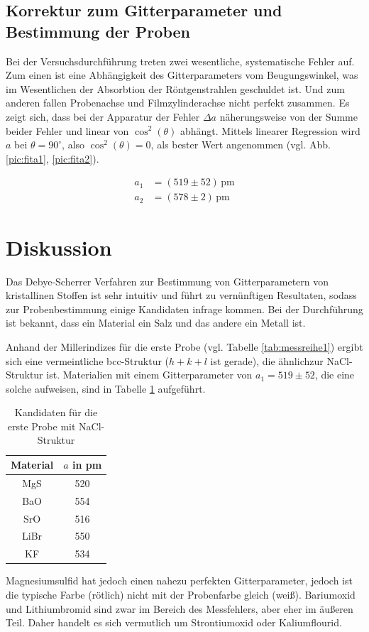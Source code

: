 \subsection{Korrektur zum Gitterparameter und Bestimmung der Proben}
Bei der Versuchsdurchführung treten zwei wesentliche, systematische Fehler auf. Zum einen ist eine Abhängigkeit des Gitterparameters vom Beugungswinkel,
was im Wesentlichen der Absorbtion der Röntgenstrahlen geschuldet ist. Und zum anderen fallen Probenachse und Filmzylinderachse nicht perfekt zusammen.
Es zeigt sich, dass bei der Apparatur der Fehler $\Delta a$ näherungsweise von der Summe beider Fehler und linear von $\cos^2(\theta)$ abhängt. Mittels
linearer Regression wird $a$ bei $\theta = 90^\circ$, also $\cos^2(\theta)=0$, als bester Wert angenommen (vgl. Abb. \ref{pic:fita1}, \ref{pic:fita2}). 

\begin{align}
 a_1 &= (519 \pm 52)\, \text{pm} \\
 \nonumber
 a_2 &= (578 \pm 2)\, \text{pm} 
 \label{eq:latticeResults}
\end{align}

\noindent




\section{Diskussion}
Das Debye-Scherrer Verfahren zur Bestimmung von Gitterparametern von kristallinen Stoffen ist sehr intuitiv und führt zu vernünftigen Resultaten, sodass
zur Probenbestimmung einige Kandidaten infrage kommen. Bei der Durchführung ist bekannt, dass ein Material ein Salz und das andere ein Metall ist. 

\noindent Anhand der Millerindizes für die erste Probe (vgl. Tabelle \ref{tab:messreihe1}) ergibt sich eine vermeintliche bcc-Struktur ($h+k+l$ ist gerade), 
die ähnlichzur NaCl-Struktur ist. Materialien mit einem Gitterparameter von $a_1 = 519 \pm 52$, die eine solche aufweisen, sind in Tabelle \ref{tab:matProb1} 
aufgeführt.

\begin{table}[H]
 \begin{tabular}{cc}
Material &$a$ in pm\\
\hline
MgS& 520\\
BaO & 554\\
SrO & 516\\
LiBr & 550\\
KF & 534
  
 \end{tabular}
 \caption{Kandidaten für die erste Probe mit NaCl-Struktur}
 \label{tab:matProb1}

\end{table}
\noindent Magnesiumsulfid hat jedoch einen nahezu perfekten Gitterparameter, jedoch ist die typische Farbe (rötlich) nicht mit der Probenfarbe gleich (weiß). 
Bariumoxid und Lithiumbromid sind zwar im Bereich des Messfehlers, aber eher im äußeren Teil. Daher handelt es sich vermutlich um Strontiumoxid oder
Kaliumflourid.

